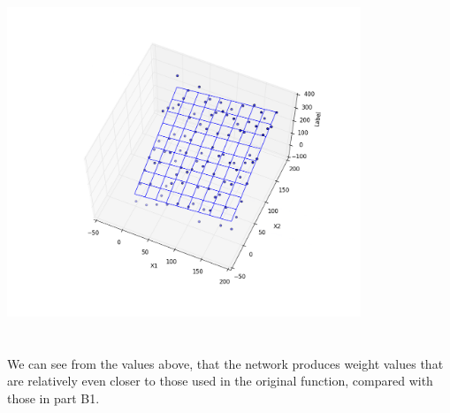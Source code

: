 \documentclass{article}
\begin{document}
\begin{center}
\vspace{2mm}
\centerline{\includegraphics[width=400px, height=400px]{partB2_3}}
\vspace{2mm}
\end{center}

\noindent We can see from the values above, that the network produces weight values that are relatively even closer to those used in the original function, compared with those in part B1.
\end{document}
